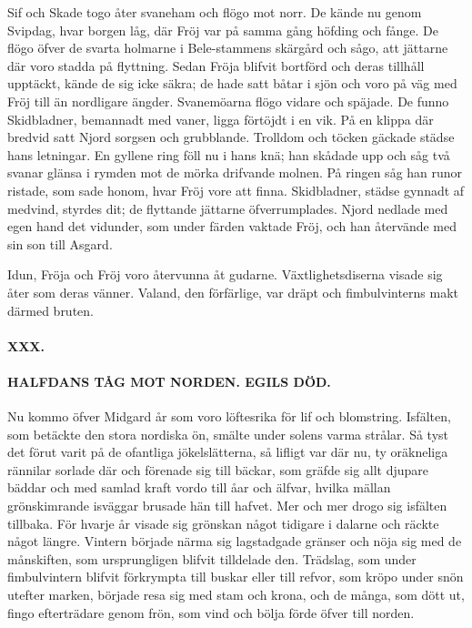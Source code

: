 Sif och Skade togo åter svaneham och flögo mot norr. De kände nu genom
Svipdag, hvar borgen låg, där Fröj var på samma gång höfding och fånge.
De flögo öfver de svarta holmarne i Bele-stammens skärgård och sågo, att
jättarne där voro stadda på flyttning. Sedan Fröja blifvit bortförd och
deras tillhåll upptäckt, kände de sig icke säkra; de hade satt båtar i
sjön och voro på väg med Fröj till än nordligare ängder. Svanemöarna
flögo vidare och späjade. De funno Skidbladner, bemannadt med vaner,
ligga förtöjdt i en vik. På en klippa där bredvid satt Njord sorgsen och
grubblande. Trolldom och töcken gäckade städse hans letningar. En
gyllene ring föll nu i hans knä; han skådade upp och såg två svanar
glänsa i rymden mot de mörka drifvande molnen. På ringen såg han runor
ristade, som sade honom, hvar Fröj vore att finna. Skidbladner, städse
gynnadt af medvind, styrdes dit; de flyttande jättarne öfverrumplades.
Njord nedlade med egen hand det vidunder, som under färden vaktade Fröj,
och han återvände med sin son till Asgard.

Idun, Fröja och Fröj voro återvunna åt gudarne. Växtlighetsdiserna
visade sig åter som deras vänner. Valand, den förfärlige, var dräpt och
fimbulvinterns makt därmed bruten.

\paragraph{XXX.}

\paragraph{HALFDANS TÅG MOT NORDEN. EGILS DÖD.}

Nu kommo öfver Midgard år som voro löftesrika för lif och blomstring.
Isfälten, som betäckte den stora nordiska ön, smälte under solens varma
strålar. Så tyst det förut varit på de ofantliga jökelslätterna, så
lifligt var där nu, ty oräkneliga rännilar sorlade där och förenade sig
till bäckar, som gräfde sig allt djupare bäddar och med samlad kraft
vordo till åar och älfvar, hvilka mällan grönskimrande isväggar brusade
hän till hafvet. Mer och mer drogo sig isfälten tillbaka. För hvarje år
visade sig grönskan något tidigare i dalarne och räckte något längre.
Vintern började närma sig
\protect\hypertarget{lb1625905.xhtmlux5cux23start114}{}{}\protect\hypertarget{lb1625905.xhtmlux5cux23start114-a}{}{}\protect\hypertarget{lb1625905.xhtmlux5cux23start114-b}{}{}\protect\hypertarget{lb1625905.xhtmlux5cux23start114-c}{}{}\protect\hypertarget{lb1625905.xhtmlux5cux23start114-d}{}{}
lagstadgade gränser och nöja sig med de månskiften, som ursprungligen
blifvit tilldelade den. Trädslag, som under fimbulvintern blifvit
förkrympta till buskar eller till refvor, som kröpo under snön utefter
marken, började resa sig med stam och krona, och de många, som dött ut,
fingo efterträdare genom frön, som vind och bölja förde öfver till
norden.

